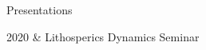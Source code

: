 \begin{rSection}{Presentations}
	\begin{timeline}
		2020 & Lithosperics Dynamics Seminar \\
	\end{timeline}
\end{rSection}
